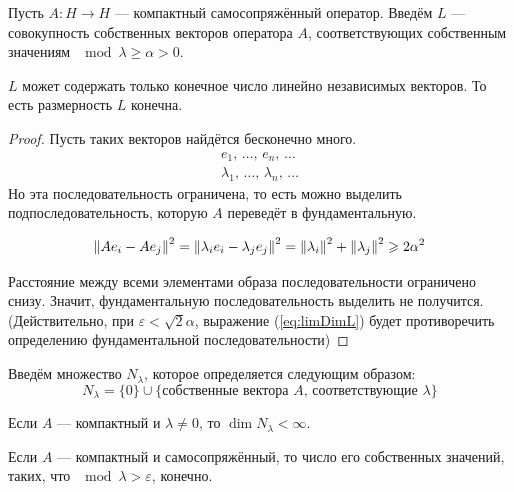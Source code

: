 \documentclass[12pt]{article}
\begin{document}
			Пусть $A: H \rightarrow H$ --- компактный самосопряжённый оператор. Введём $L$ --- совокупность 
			собственных векторов оператора $A$, соответствующих собственным значениям $\mod{\lambda} \geq \alpha > 0$.
			\begin{state} \label{st:limLambda}	
				$L$ может содержать только конечное число {\color{gray}линейно независимых} векторов.		
				{\color{gray} То есть размерность $L$ конечна.}
			\end{state}
			\begin{proof}
				Пусть таких векторов найдётся бесконечно много.
				\begin{gather*}
				 	e_1      ,\, \dots,\, e_n      ,\, \dots \\
					\lambda_1,\, \dots,\, \lambda_n,\, \dots
				\end{gather*}
				Но эта последовательность ограничена, то есть можно выделить подпоследовательность, которую $A$ переведёт в фундаментальную.
		
				\begin{equation} \label{eq:limDimL}
					\left\| Ae_i - Ae_j \right\|^2 = \left\| \lambda_ie_i - \lambda_je_j \right\|^2 = \left\| \lambda_i \right\|^2 + \left\| \lambda_j \right\|^2 \geqslant 2\alpha^2
				\end{equation}
		
				Расстояние между всеми элементами образа последовательности ограничено снизу. Значит, фундаментальную последовательность
				выделить не получится. \color{gray}(Действительно, при $\varepsilon < \sqrt{2}\alpha$, выражение (\ref{eq:limDimL}) будет 
				противоречить определению фундаментальной последовательности)
			\end{proof}
	
			Введём множество $N_{\lambda}$, которое определяется следующим образом:
			$$N_{\lambda} = \{0\} \cup \{\text{собственные вектора $A$, соответствующие $\lambda$}\}$$
	
			\begin{note}
				Если $A$ --- компактный и $\lambda \neq 0$, то $\dim N_{\lambda} < \infty$.
			\end{note}
			\begin{note}
				Если $A$ --- компактный и самосопряжённый, то число его собственных значений, таких, 
				что $\mod{\lambda} > \varepsilon$, конечно.
			\end{note}
	
\end{document}
